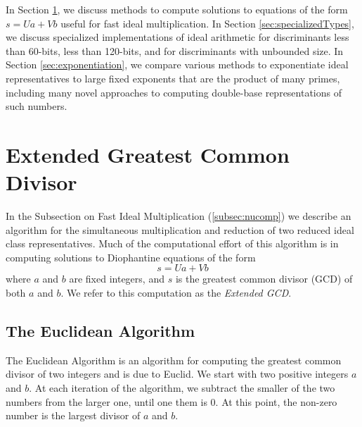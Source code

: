\documentclass{ucalgthes1}
\theoremstyle{plain}
\theoremstyle{definition}
\begin{document}
In Section \ref{sec:eea}, we discuss methods to compute solutions to equations of the form $s = Ua + Vb$ useful for fast ideal multiplication. In Section \ref{sec:specializedTypes}, we discuss specialized implementations of ideal arithmetic for discriminants less than 60-bits, less than 120-bits, and for discriminants with unbounded size. In Section \ref{sec:exponentiation}, we compare various methods to exponentiate ideal representatives to large fixed exponents that are the product of many primes, including many novel approaches to computing double-base representations of such numbers.

\section{Extended Greatest Common Divisor}
\label{sec:eea}

In the Subsection on Fast Ideal Multiplication (\ref{subsec:nucomp}) we describe an algorithm for the simultaneous multiplication and reduction of two reduced ideal class representatives.  Much of the computational effort of this algorithm is in computing solutions to Diophantine equations of the form
\[
	s = Ua + Vb
\]
where $a$ and $b$ are fixed integers, and $s$ is the greatest common divisor (GCD) of both $a$ and $b$.  We refer to this computation as the \emph{Extended GCD}.

\subsection{The Euclidean Algorithm}

The Euclidean Algorithm is an algorithm for computing the greatest common divisor of two integers and is due to Euclid.  We start with two positive integers $a$ and $b$.  At each iteration of the algorithm, we subtract the smaller of the two numbers from the larger one, until one them is 0. At this point, the non-zero number is the largest divisor of $a$ and $b$.
\end{document}
